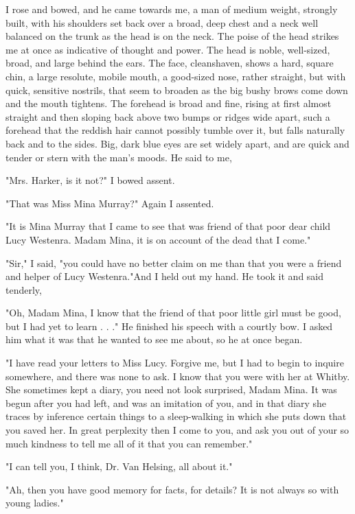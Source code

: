 I rose and bowed, and he came towards me, a man of medium weight, strongly built, with his shoulders set back over a broad, deep chest and a neck well balanced on the trunk as the head is on the neck. The poise of the head strikes me at once as indicative of thought and power. The head is noble, well-sized, broad, and large behind the ears. The face, cleanshaven, shows a hard, square chin, a large resolute, mobile mouth, a good-sized nose, rather straight, but with quick, sensitive nostrils, that seem to broaden as the big bushy brows come down and the mouth tightens. The forehead is broad and fine, rising at first almost straight and then sloping back above two bumps or ridges wide apart, such a forehead that the reddish hair cannot possibly tumble over it, but falls naturally back and to the sides. Big, dark blue eyes are set widely apart, and are quick and tender or stern with the man's moods. He said to me, 

"Mrs. Harker, is it not?" I bowed assent. 

"That was Miss Mina Murray?" Again I assented. 

"It is Mina Murray that I came to see that was friend of that poor dear child Lucy Westenra. Madam Mina, it is on account of the dead that I come." 

"Sir," I said, "you could have no better claim on me than that you were a friend and helper of Lucy Westenra."And I held out my hand. He took it and said tenderly, 

"Oh, Madam Mina, I know that the friend of that poor little girl must be good, but I had yet to learn . . ." He finished his speech with a courtly bow. I asked him what it was that he wanted to see me about, so he at once began. 

"I have read your letters to Miss Lucy. Forgive me, but I had to begin to inquire somewhere, and there was none to ask. I know that you were with her at Whitby. She sometimes kept a diary, you need not look surprised, Madam Mina. It was begun after you had left, and was an imitation of you, and in that diary she traces by inference certain things to a sleep-walking in which she puts down that you saved her. In great perplexity then I come to you, and ask you out of your so much kindness to tell me all of it that you can remember." 

"I can tell you, I think, Dr. Van Helsing, all about it." 

"Ah, then you have good memory for facts, for details? It is not always so with young ladies." 

